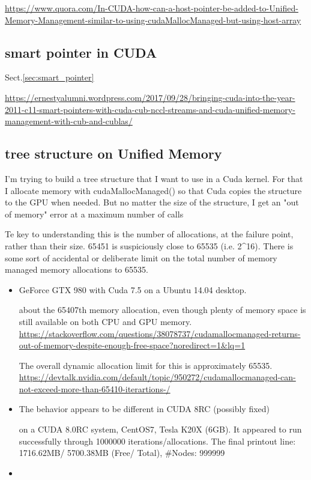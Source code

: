 \url{https://www.quora.com/In-CUDA-how-can-a-host-pointer-be-added-to-Unified-Memory-Management-similar-to-using-cudaMallocManaged-but-using-host-array}


\subsection{smart pointer in CUDA}

Sect.\ref{sec:smart_pointer}


\url{https://ernestyalumni.wordpress.com/2017/09/28/bringing-cuda-into-the-year-2011-c11-smart-pointers-with-cuda-cub-nccl-streams-and-cuda-unified-memory-management-with-cub-and-cublas/}


\subsection{tree structure on Unified Memory}
\label{sec:UM_number-of-cudaMallocManaged-call}


I'm trying to build a tree structure that I want to use in a Cuda kernel. For
that I allocate memory with cudaMallocManaged() so that Cuda copies the
structure to the GPU when needed. But no matter the size of the structure, I get
an "out of memory" error at a maximum number of calls

Te key to understanding this is the number of allocations, at the failure point,
rather than their size. 65451 is suspiciously close to 65535 (i.e. 2^16).
There is some sort of accidental or deliberate limit on the total number of
memory managed memory allocations to 65535.

\begin{itemize}
  \item GeForce GTX 980 with Cuda 7.5 on a Ubuntu 14.04 desktop.

about the 65407th memory allocation, even though plenty of memory space is still
available on both CPU and GPU memory.
\url{https://stackoverflow.com/questions/38078737/cudamallocmanaged-returns-out-of-memory-despite-enough-free-space?noredirect=1&lq=1}

The overall dynamic allocation limit for this is approximately 65535.
\url{https://devtalk.nvidia.com/default/topic/950272/cudamallocmanaged-can-not-exceed-more-than-65410-iterartions-/}
  
  \item The behavior appears to be different in CUDA 8RC (possibly fixed)
  
  on a CUDA 8.0RC system, CentOS7, Tesla K20X (6GB). It appeared to run successfully through 1000000 iterations/allocations. The final printout line: 1716.62MB/ 5700.38MB (Free/ Total), #Nodes: 999999
  
  \item 
\end{itemize}

